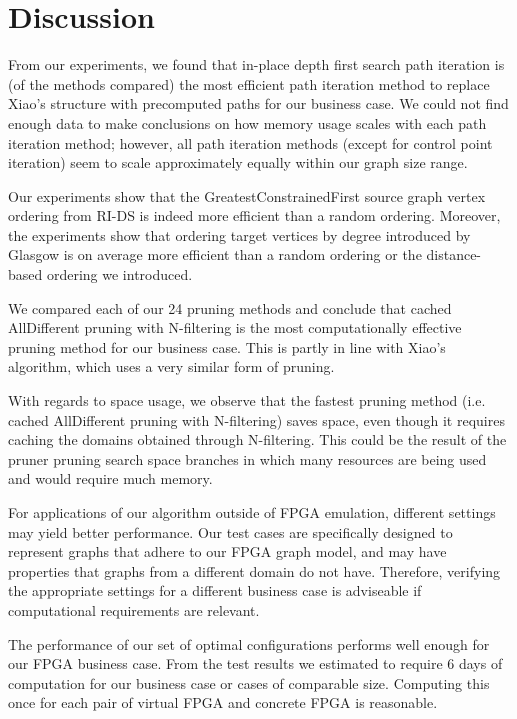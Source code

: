 \chapter{Discussion}
\label{chapter:discussion}
From our experiments, we found that in-place depth first search path iteration is (of the methods compared) the most efficient path iteration method to replace Xiao's structure with precomputed paths for our business case. We could not find enough data to make conclusions on how memory usage scales with each path iteration method; however, all path iteration methods (except for control point iteration) seem to scale approximately equally within our graph size range.

Our experiments show that the GreatestConstrainedFirst source graph vertex ordering from RI-DS \cite{RIalgorithm} is indeed more efficient than a random ordering. Moreover, the experiments show that ordering target vertices by degree introduced by Glasgow \cite{McCreesh2015} is on average more efficient than a random ordering or the distance-based ordering we introduced.

We compared each of our 24 pruning methods and conclude that cached AllDifferent pruning with N-filtering is the most computationally effective pruning method for our business case. This is partly in line with Xiao's algorithm, which uses a very similar form of pruning.

With regards to space usage, we observe that the fastest pruning method (i.e. cached AllDifferent pruning with N-filtering) saves space, even though it requires caching the domains obtained through N-filtering. This could be the result of the pruner pruning search space branches in which many resources are being used and would require much memory.

For applications of our algorithm outside of FPGA emulation, different settings may yield better performance. Our test cases are specifically designed to represent graphs that adhere to our FPGA graph model, and may have properties that graphs from a different domain do not have. Therefore, verifying the appropriate settings for a different business case is adviseable if computational requirements are relevant.

The performance of our set of optimal configurations performs well enough for our FPGA business case. From the test results we estimated to require 6 days of computation for our business case or cases of comparable size. Computing this once for each pair of virtual FPGA and concrete FPGA is reasonable.

